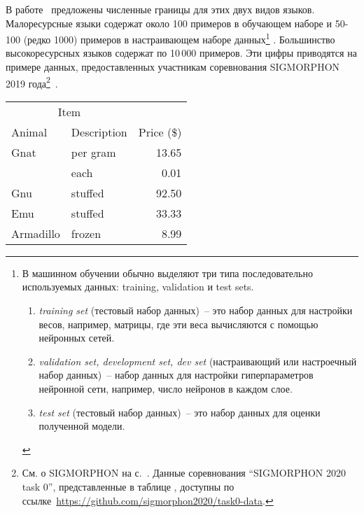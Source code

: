 В работе~\cite{Anastasopoulos2019Pushing_Limits_Low-Resource_MI} 
предложены численные границы для этих двух видов языков.
Малоресурсные языки содержат около 100 примеров в обучающем наборе 
и 50-100 (редко 1000) примеров в настраивающем наборе данных\footnote{%
    В машинном обучении обычно выделяют три типа 
    последовательно используемых данных: training, validation и test sets.
    \begin{enumerate}[label=(\roman*)]
        \item \emph{training set} (тестовый набор данных)~-- 
            это набор данных для настройки весов, например, матрицы, 
            где эти веса вычисляются с помощью нейронных сетей.

        \item \emph{validation set, development set, dev set} 
            (настраивающий или настроечный набор данных)~-- 
            набор данных для настройки гиперпараметров нейронной сети, 
            например, число нейронов в каждом слое.

        \item \emph{test set} (тестовый набор данных)~-- это набор данных 
            для оценки полученной модели. 
    \end{enumerate}
    }%
%
. 
Большинство высокоресурсных языков содержат по 10\,000 примеров.
Эти цифры приводятся на примере данных, 
предоставленных участникам соревнования SIGMORPHON 2019 года\footnote{%
    См. о SIGMORPHON на с.~\pageref{SIGMORPHON}.
    Данные соревнования ``SIGMORPHON 2020 task 0'', представленные 
    в таблице , 
    доступны по 
    ссылке~\url{https://github.com/sigmorphon2020/task0-data}.
}~\cite{Anastasopoulos2019Pushing_Limits_Low-Resource_MI}.


\newpage\clearpage


\begin{tabular}{llr}
\hline
\multicolumn{2}{c}{Item} \\
\cline{1-2}
Animal    & Description & Price (\$) \\
\hline
Gnat      & per gram    & 13.65      \\
          & each        & 0.01       \\
Gnu       & stuffed     & 92.50      \\
Emu       & stuffed     & 33.33      \\
Armadillo & frozen      & 8.99       \\
\hline
\end{tabular}




